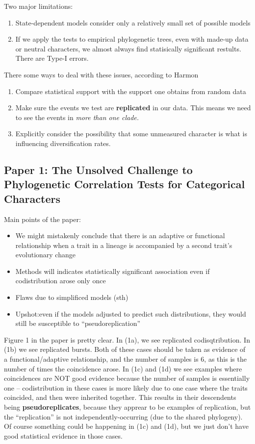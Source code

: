 \documentclass{article}
\begin{document}
Two major limitations:
\begin{enumerate}
\item State-dependent models consider only a relatively small set of possible
models
\item If we apply the tests to empirical phylogenetic trees, even with made-up
data or neutral characters, we almost always find statisically significant
restults. There are Type-I errors.
\end{enumerate}
There some ways to deal with these issues, according to Harmon
\begin{enumerate}
\item Compare statistical support with the support one obtains from random data
\item Make sure the events we test are \textbf{replicated} in our data. This
means we need to see the events in \textit{more than one clade.}
\item Explicitly consider the possibility that some unmeasured character is what
is influencing diversification rates. 
\end{enumerate}

\subsection{Paper 1: The Unsolved Challenge to Phylogenetic Correlation Tests
  for Categorical Characters}
Main points of the paper:
\begin{itemize}
\item We might mistakenly conclude that there is an adaptive or functional
relationship when a trait in a lineage is accompanied by a second trait's
evolutionary change
\item Methods will indicates statistically significant association even if
codistribution arose only once
\item Flaws due to simplificed models (sth)
\item Upshot:even if the models adjusted to predict such distributions, they
would still be susceptible to ``pseudoreplication''
\end{itemize}

Figure 1 in the paper is pretty clear. In (1a), we see replicated
codisqtribution. In (1b) we see replicated bursts. Both of these cases should be
taken as evidence of a functional/adaptive relationship, and the number of
samples is 6, as this is the number of times the coincidence arose. In (1c) and
(1d) we see examples where coincidences are NOT good evidence because the number
of samples is essentially one -- codistribution in these cases is more likely
due to one case where the traits coincided, and then were inherited together.
This results in their descendents being \textbf{pseudoreplicates}, because they
apprear to be examples of replication, but the ``replication'' is not
independently-occurring (due to the shared phylogeny). Of course something could
be happening in (1c) and (1d), but we just don't have good statistical evidence
in those cases.
\end{document}
